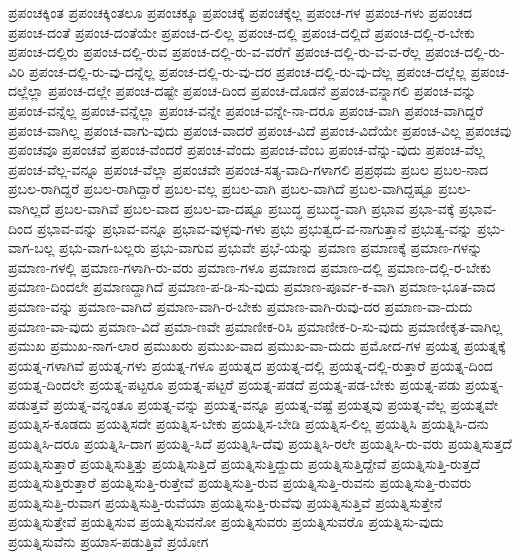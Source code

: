 {ಪ್ರಪಂಚಕ್ಕಿಂತ
ಪ್ರಪಂಚಕ್ಕಿಂತಲೂ
ಪ್ರಪಂಚಕ್ಕೂ
ಪ್ರಪಂಚಕ್ಕೆ
ಪ್ರಪಂಚಕ್ಕೆಲ್ಲ
ಪ್ರಪಂಚ-ಗಳ
ಪ್ರಪಂಚ-ಗಳು
ಪ್ರಪಂಚದ
ಪ್ರಪಂಚ-ದಂತೆ
ಪ್ರಪಂಚ-ದಂತೆಯೇ
ಪ್ರಪಂಚ-ದ-ಲಿಲ್ಲ
ಪ್ರಪಂಚ-ದಲ್ಲಿ
ಪ್ರಪಂಚ-ದಲ್ಲಿದೆ
ಪ್ರಪಂಚ-ದಲ್ಲಿ-ರ-ಬೇಕು
ಪ್ರಪಂಚ-ದಲ್ಲಿರು
ಪ್ರಪಂಚ-ದಲ್ಲಿ-ರುವ
ಪ್ರಪಂಚ-ದಲ್ಲಿ-ರು-ವ-ವರೆಗೆ
ಪ್ರಪಂಚ-ದಲ್ಲಿ-ರು-ವ-ವ-ರೆಲ್ಲ
ಪ್ರಪಂಚ-ದಲ್ಲಿ-ರು-ವಿರಿ
ಪ್ರಪಂಚ-ದಲ್ಲಿ-ರು-ವು-ದನ್ನೆಲ್ಲ
ಪ್ರಪಂಚ-ದಲ್ಲಿ-ರು-ವು-ದರ
ಪ್ರಪಂಚ-ದಲ್ಲಿ-ರು-ವು-ದೆಲ್ಲ
ಪ್ರಪಂಚ-ದಲ್ಲೆಲ್ಲ
ಪ್ರಪಂಚ-ದಲ್ಲೆಲ್ಲಾ
ಪ್ರಪಂಚ-ದಲ್ಲೇ
ಪ್ರಪಂಚ-ದಷ್ಟೇ
ಪ್ರಪಂಚ-ದಿಂದ
ಪ್ರಪಂಚ-ದೊಡನೆ
ಪ್ರಪಂಚ-ವನ್ನಾಗಲಿ
ಪ್ರಪಂಚ-ವನ್ನು
ಪ್ರಪಂಚ-ವನ್ನೆಲ್ಲ
ಪ್ರಪಂಚ-ವನ್ನೆಲ್ಲಾ
ಪ್ರಪಂಚ-ವನ್ನೇ
ಪ್ರಪಂಚ-ವನ್ನೇ-ನಾ-ದರೂ
ಪ್ರಪಂಚ-ವಾಗಿ
ಪ್ರಪಂಚ-ವಾಗಿದ್ದರೆ
ಪ್ರಪಂಚ-ವಾಗಿಲ್ಲ
ಪ್ರಪಂಚ-ವಾಗು-ವುದು
ಪ್ರಪಂಚ-ವಾದರೆ
ಪ್ರಪಂಚ-ವಿದೆ
ಪ್ರಪಂಚ-ವಿದೆಯೇ
ಪ್ರಪಂಚ-ವಿಲ್ಲ
ಪ್ರಪಂಚವು
ಪ್ರಪಂಚವೂ
ಪ್ರಪಂಚವೆ
ಪ್ರಪಂಚ-ವೆಂದರೆ
ಪ್ರಪಂಚ-ವೆಂದು
ಪ್ರಪಂಚ-ವೆಂಬ
ಪ್ರಪಂಚ-ವೆನ್ನು-ವುದು
ಪ್ರಪಂಚ-ವೆಲ್ಲ
ಪ್ರಪಂಚ-ವೆಲ್ಲ-ವನ್ನೂ
ಪ್ರಪಂಚ-ವೆಲ್ಲಾ
ಪ್ರಪಂಚವೇ
ಪ್ರಪಂಚ-ಸತ್ಯ-ವಾದಿ-ಗಳಾಗಲಿ
ಪ್ರಪ್ರಥಮ
ಪ್ರಬಲ
ಪ್ರಬಲ-ನಾದ
ಪ್ರಬಲ-ರಾಗಿದ್ದರೆ
ಪ್ರಬಲ-ರಾಗಿದ್ದಾರೆ
ಪ್ರಬಲ-ವಲ್ಲ
ಪ್ರಬಲ-ವಾಗಿ
ಪ್ರಬಲ-ವಾಗಿದೆ
ಪ್ರಬಲ-ವಾಗಿದ್ದಷ್ಟೂ
ಪ್ರಬಲ-ವಾಗಿಲ್ಲದೆ
ಪ್ರಬಲ-ವಾಗಿವೆ
ಪ್ರಬಲ-ವಾದ
ಪ್ರಬಲ-ವಾ-ದಷ್ಟೂ
ಪ್ರಬುದ್ಧ
ಪ್ರಬುದ್ಧ-ವಾಗಿ
ಪ್ರಭಾವ
ಪ್ರಭಾ-ವಕ್ಕೆ
ಪ್ರಭಾವ-ದಿಂದ
ಪ್ರಭಾವ-ವನ್ನು
ಪ್ರಭಾವ-ವನ್ನೂ
ಪ್ರಭಾವ-ವುಳ್ಳವು-ಗಳು
ಪ್ರಭು
ಪ್ರಭುತ್ವದ-ವ-ನಾಗುತ್ತಾನೆ
ಪ್ರಭುತ್ವ-ವನ್ನು
ಪ್ರಭು-ವಾಗ-ಬಲ್ಲ
ಪ್ರಭು-ವಾಗ-ಬಲ್ಲರು
ಪ್ರಭು-ವಾಗುವ
ಪ್ರಭುವೇ
ಪ್ರಭೆ-ಯನ್ನು
ಪ್ರಮಾಣ
ಪ್ರಮಾಣಕ್ಕೆ
ಪ್ರಮಾಣ-ಗಳನ್ನು
ಪ್ರಮಾಣ-ಗಳಲ್ಲಿ
ಪ್ರಮಾಣ-ಗಳಾಗಿ-ರು-ವರು
ಪ್ರಮಾಣ-ಗಳೂ
ಪ್ರಮಾಣದ
ಪ್ರಮಾಣ-ದಲ್ಲಿ
ಪ್ರಮಾಣ-ದಲ್ಲಿ-ರ-ಬೇಕು
ಪ್ರಮಾಣ-ದಿಂದಲೇ
ಪ್ರಮಾಣದ್ದಾಗಿದೆ
ಪ್ರಮಾಣ-ಪ-ಡಿ-ಸು-ವುದು
ಪ್ರಮಾಣ-ಪೂರ್ವ-ಕ-ವಾಗಿ
ಪ್ರಮಾಣ-ಭೂತ-ವಾದ
ಪ್ರಮಾಣ-ವನ್ನು
ಪ್ರಮಾಣ-ವಾಗಿದೆ
ಪ್ರಮಾಣ-ವಾಗಿ-ರ-ಬೇಕು
ಪ್ರಮಾಣ-ವಾಗಿ-ರುವು-ದರ
ಪ್ರಮಾಣ-ವಾ-ದುದು
ಪ್ರಮಾಣ-ವಾ-ವುದು
ಪ್ರಮಾಣ-ವಿದೆ
ಪ್ರಮಾ-ಣವೇ
ಪ್ರಮಾಣೀಕ-ರಿಸಿ
ಪ್ರಮಾಣೀಕ-ರಿ-ಸು-ವುದು
ಪ್ರಮಾಣೀಕೃತ-ವಾಗಿಲ್ಲ
ಪ್ರಮುಖ
ಪ್ರಮುಖ-ನಾಗ-ಲಾರ
ಪ್ರಮುಖರು
ಪ್ರಮುಖ-ವಾದ
ಪ್ರಮುಖ-ವಾ-ದುದು
ಪ್ರಮೋದ-ಗಳ
ಪ್ರಯತ್ನ
ಪ್ರಯತ್ನಕ್ಕೆ
ಪ್ರಯತ್ನ-ಗಳಾಗಿವೆ
ಪ್ರಯತ್ನ-ಗಳು
ಪ್ರಯತ್ನ-ಗಳೂ
ಪ್ರಯತ್ನದ
ಪ್ರಯತ್ನ-ದಲ್ಲಿ
ಪ್ರಯತ್ನ-ದಲ್ಲಿ-ರುತ್ತಾರೆ
ಪ್ರಯತ್ನ-ದಿಂದ
ಪ್ರಯತ್ನ-ದಿಂದಲೇ
ಪ್ರಯತ್ನ-ಪಟ್ಟರೂ
ಪ್ರಯತ್ನ-ಪಟ್ಟರೆ
ಪ್ರಯತ್ನ-ಪಡದೆ
ಪ್ರಯತ್ನ-ಪಡ-ಬೇಕು
ಪ್ರಯತ್ನ-ಪಡು
ಪ್ರಯತ್ನ-ಪಡುತ್ತವೆ
ಪ್ರಯತ್ನ-ವನ್ನಂತೂ
ಪ್ರಯತ್ನ-ವನ್ನು
ಪ್ರಯತ್ನ-ವನ್ನೂ
ಪ್ರಯತ್ನ-ವಷ್ಟೆ
ಪ್ರಯತ್ನವು
ಪ್ರಯತ್ನ-ವೆಲ್ಲ
ಪ್ರಯತ್ನವೇ
ಪ್ರಯತ್ನಿಸ-ಕೂಡದು
ಪ್ರಯತ್ನಿಸದೇ
ಪ್ರಯತ್ನಿಸ-ಬೇಕು
ಪ್ರಯತ್ನಿಸ-ಬೇಡಿ
ಪ್ರಯತ್ನಿಸ-ಲಿಲ್ಲ
ಪ್ರಯತ್ನಿಸಿ
ಪ್ರಯತ್ನಿಸಿ-ದನು
ಪ್ರಯತ್ನಿಸಿ-ದರೂ
ಪ್ರಯತ್ನಿಸಿ-ದಾಗ
ಪ್ರಯತ್ನಿ-ಸಿದೆ
ಪ್ರಯತ್ನಿಸಿ-ದೆವು
ಪ್ರಯತ್ನಿಸಿ-ರಲೇ
ಪ್ರಯತ್ನಿಸಿ-ರು-ವರು
ಪ್ರಯತ್ನಿಸುತ್ತದೆ
ಪ್ರಯತ್ನಿಸುತ್ತಾರೆ
ಪ್ರಯತ್ನಿಸುತ್ತಿತ್ತು
ಪ್ರಯತ್ನಿಸುತ್ತಿದೆ
ಪ್ರಯತ್ನಿಸುತ್ತಿದ್ದುದು
ಪ್ರಯತ್ನಿಸುತ್ತಿದ್ದೇವೆ
ಪ್ರಯತ್ನಿಸುತ್ತಿ-ರುತ್ತದೆ
ಪ್ರಯತ್ನಿಸುತ್ತಿರುತ್ತಾರೆ
ಪ್ರಯತ್ನಿಸುತ್ತಿ-ರುತ್ತೇವೆ
ಪ್ರಯತ್ನಿಸುತ್ತಿ-ರುವ
ಪ್ರಯತ್ನಿಸುತ್ತಿ-ರುವನು
ಪ್ರಯತ್ನಿಸುತ್ತಿ-ರುವರು
ಪ್ರಯತ್ನಿಸುತ್ತಿ-ರುವಾಗ
ಪ್ರಯತ್ನಿಸುತ್ತಿ-ರುವೆಯಾ
ಪ್ರಯತ್ನಿಸುತ್ತಿ-ರುವೆವು
ಪ್ರಯತ್ನಿಸುತ್ತಿವೆ
ಪ್ರಯತ್ನಿಸುತ್ತೇನೆ
ಪ್ರಯತ್ನಿಸುತ್ತೇವೆ
ಪ್ರಯತ್ನಿಸುವ
ಪ್ರಯತ್ನಿಸುವನೋ
ಪ್ರಯತ್ನಿಸುವರು
ಪ್ರಯತ್ನಿಸುವರೊ
ಪ್ರಯತ್ನಿಸು-ವುದು
ಪ್ರಯತ್ನಿಸುವೆನು
ಪ್ರಯಾಸ-ಪಡುತ್ತಿವೆ
ಪ್ರಯೋಗ
}
